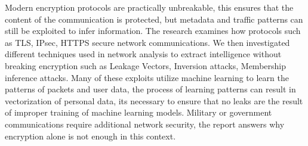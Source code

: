 Modern encryption protocols are practically unbreakable, this ensures that the content of the communication is protected, but metadata and traffic patterns can still be exploited to infer information. 
The research examines how protocols such as TLS, IPsec, HTTPS secure network communications. 
We then investigated different techniques used in network analysis to extract intelligence without breaking encryption such as Leakage Vectors, Inversion attacks, Membership inference attacks. 
Many of these exploits utilize machine learning to learn the patterns of packets and user data, the process of learning patterns can result in vectorization of personal data, its necessary to ensure that no leaks are the result of improper training of machine learning models.  
Military or government communications require additional network security, the report answers why encryption alone is not enough in this context. 